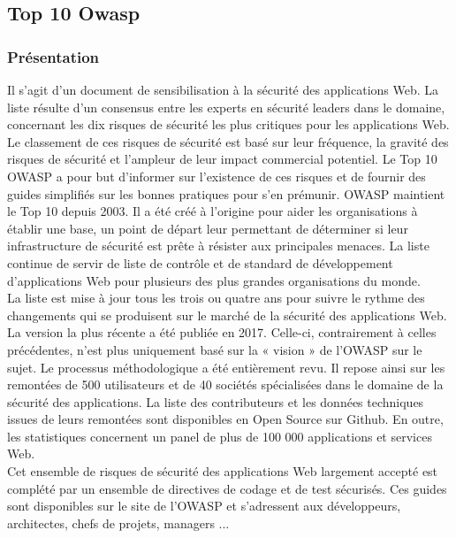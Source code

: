 \subsection{Top 10 Owasp}
\subsubsection{Présentation}
Il s’agit d’un document de sensibilisation à la sécurité des applications Web. La liste résulte d’un consensus entre les experts en sécurité leaders dans le domaine, concernant les dix risques de sécurité les plus critiques pour les applications Web. Le classement de ces risques de sécurité est basé sur leur fréquence, la gravité des risques de sécurité et l'ampleur de leur impact commercial potentiel. Le Top 10 OWASP a pour but d’informer sur l’existence de ces risques et de fournir des guides simplifiés sur les bonnes pratiques pour s’en prémunir. OWASP maintient le Top 10 depuis 2003. Il a été créé à l'origine pour aider les organisations à établir une base, un point de départ leur permettant de déterminer si leur infrastructure de sécurité est prête à résister aux principales menaces. La liste continue de servir de liste de contrôle et de standard de développement d'applications Web pour plusieurs des plus grandes organisations du monde. \\
La liste est mise à jour tous les trois ou quatre ans pour suivre le rythme des changements qui se produisent sur le marché de la sécurité des applications Web. La version la plus récente a été publiée en 2017. Celle-ci, contrairement à celles précédentes, n’est plus uniquement basé sur la « vision » de l’OWASP sur le sujet. Le processus méthodologique a été entièrement revu. Il repose ainsi sur les remontées de 500 utilisateurs et de 40 sociétés spécialisées dans le domaine de la sécurité des applications. La liste des contributeurs et les données techniques issues de leurs remontées sont disponibles en Open Source sur Github. En outre, les statistiques concernent un panel de plus de 100 000 applications et services Web.\\
Cet ensemble de risques de sécurité des applications Web largement accepté est complété par un ensemble de directives de codage et de test sécurisés. Ces guides sont disponibles sur le site de l'OWASP et s'adressent aux développeurs, architectes, chefs de projets, managers ...
